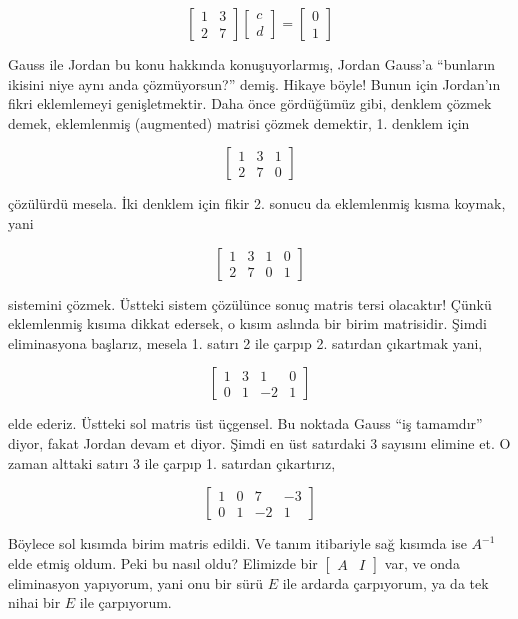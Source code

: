 \documentclass[12pt,fleqn]{article}\usepackage{../../common}
\begin{document}
$$ 
\left[\begin{array}{rrr}
1 & 3 \\
2 & 7
\end{array}\right]
\left[\begin{array}{r}
c  \\
d 
\end{array}\right]
=
\left[\begin{array}{rrr}
0  \\
1
\end{array}\right]
 $$

Gauss ile Jordan bu konu hakkında konuşuyorlarmış, Jordan Gauss'a
``bunların ikisini niye aynı anda çözmüyorsun?'' demiş. Hikaye böyle! Bunun
için Jordan'ın fikri eklemlemeyi genişletmektir. Daha önce gördüğümüz gibi,
denklem çözmek demek, eklemlenmiş (augmented) matrisi çözmek demektir,
1. denklem için 

$$ 
\left[\begin{array}{rr|r}
1 & 3 & 1\\
2 & 7 & 0
\end{array}\right]
$$

çözülürdü mesela. İki denklem için fikir 2. sonucu da eklemlenmiş kısma
koymak, yani 
        
$$ 
\left[\begin{array}{rr|rr}
1 & 3 & 1 & 0\\
2 & 7 & 0 & 1
\end{array}\right]
 $$

sistemini çözmek. Üstteki sistem çözülünce sonuç matris tersi olacaktır!
Çünkü eklemlenmiş kısıma dikkat edersek, o kısım aslında bir birim
matrisidir. Şimdi eliminasyona başlarız, mesela 1. satırı 2 ile çarpıp
2. satırdan çıkartmak yani,

        
$$ 
\left[\begin{array}{rr|rr}
1 & 3 & 1 & 0\\
0 & 1 & -2 & 1
\end{array}\right]
 $$

elde ederiz. Üstteki sol matris üst üçgensel. Bu noktada Gauss ``iş
tamamdır'' diyor, fakat Jordan devam et diyor. Şimdi en üst satırdaki 3
sayısını elimine et. O zaman alttaki satırı 3 ile çarpıp 1. satırdan
çıkartırız,

$$ 
\left[\begin{array}{rr|rr}
1 & 0 & 7 & -3\\
0 & 1 & -2 & 1
\end{array}\right]
 $$

Böylece sol kısımda birim matris edildi. Ve tanım itibariyle sağ kısımda
ise $A^{-1}$ elde etmiş oldum. Peki bu nasıl oldu? Elimizde bir
$\left[\begin{array}{r|r}A & I\end{array}\right]$ var, ve onda 
eliminasyon yapıyorum, yani onu bir sürü $E$ ile ardarda 
çarpıyorum, ya da tek nihai bir $E$ ile çarpıyorum. 
\end{document}
